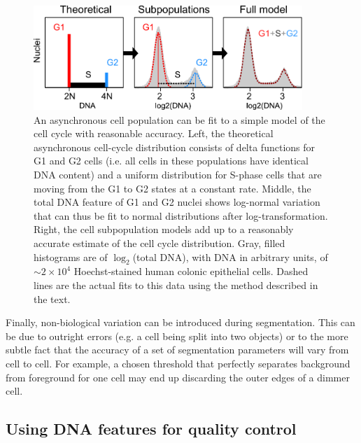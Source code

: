   \begin{figure}[!bt]
  \centering
  \includegraphics[width=4in]{FIGS/imaging/cycleFit.pdf}
  {\singlespacing 
  \caption[ Fitting total DNA to a simple cell cycle model.]
            {An asynchronous cell population can be
            fit to a simple model of the cell cycle
            with reasonable accuracy. Left,
            the theoretical
            asynchronous cell-cycle distribution consists
            of delta functions for G1 and G2 cells (i.e.
            all cells in these populations have identical
            DNA content) and a uniform distribution for
            S-phase cells that are moving from the G1 to G2
            states at a constant rate. Middle, the
            total DNA feature of G1 and G2 nuclei shows log-normal variation
            that can thus be fit to normal distributions after log-transformation.
            Right, the cell subpopulation models 
            add up to a reasonably accurate estimate
            of the cell cycle distribution. Gray, filled
            histograms are of $\log_2$(total DNA), with 
            DNA in arbitrary units, of $\sim2\times10^4$ Hoechst-stained
            human colonic epithelial cells. Dashed lines are
            the actual fits to this data using the method described
            in the text.}
  \label{fig:imaging:cycleFit}}
  \end{figure}


Finally, non-biological variation can be introduced
during segmentation. This can be due to outright errors
(e.g. a cell being split into two objects) or to
the more subtle fact that the accuracy of a set of
segmentation parameters will vary from cell to cell.
For example, a chosen threshold that perfectly separates
background from foreground for one cell may end up
discarding the outer edges of a dimmer cell.


\subsection{Using DNA features for quality control}
\label{imaging:variation:dnaQC}

